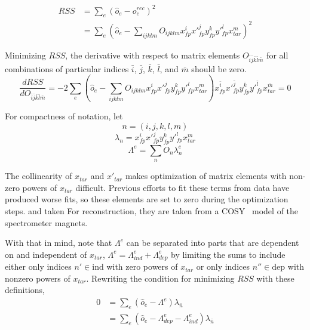 \begin{align}
    RSS &= \sum_e (\hat{o}_e - o^{rec}_e)^2 \\
           &= \sum_e \left( \hat{o}_e - \sum_{ijklm} O_{ijklm} x^i_{fp} x'^j_{fp} y^k_{fp} y'^l_{fp} x^m_{tar} \right)^2
\end{align}


Minimizing $RSS$, the derivative with respect to matrix elements
$O_{\bar{i}\bar{j}\bar{k}\bar{l}\bar{m}}$
for all combinations of particular indices
$\bar{i}$, $\bar{j}$, $\bar{k}$, $\bar{l}$, and $\bar{m}$
should be zero.
\begin{equation}
    \frac{dRSS}{dO_{\bar{i}\bar{j}\bar{k}\bar{l}\bar{m}}}
    = -2 \sum_e \left( \hat{o}_e - \sum_{ijklm} O_{ijklm} x^i_{fp} x'^j_{fp} y^k_{fp} y'^l_{fp} x^m_{tar} \right)
      x^{\bar{i}}_{fp} x'^{\bar{j}}_{fp} y^{\bar{k}}_{fp} y'^{\bar{l}}_{fp} x^{\bar{m}}_{tar}
    = 0
\end{equation}

For compactness of notation, let
\begin{equation} \label{eqn:index_abbreviation}
    n = (i,j,k,l,m)
\end{equation}
\begin{equation}
    \lambda_n = x^{i}_{fp} x'^{j}_{fp} y^{k}_{fp} y'^{l}_{fp} x^{m}_{tar}
\end{equation}
\begin{equation}
    \Lambda^e = \sum_n O_n \lambda^e_n
\end{equation}


The collinearity of $x_{tar}$ and $x'_{tar}$ makes optimization of matrix
elements with non-zero powers of $x_{tar}$ difficult.
Previous efforts to fit these terms from data have produced worse fits, so
these elements are set to zero during the optimization steps.
and taken
For reconstruction, they are taken from a COSY~\cite{COSY_9} model of the
spectrometer magnets.


With that in mind, note that $\Lambda^e$ can be separated into parts that are
dependent on and independent of $x_{tar}$,
$\Lambda^e = \Lambda^e_{ind} + \Lambda^e_{dep}$
by limiting the sums to include either
only indices $n'\in\text{ind}$ with zero powers of $x_{tar}$
or
only indices $n''\in\text{dep}$ with nonzero powers of $x_{tar}$.
Rewriting the condition for minimizing $RSS$ with these definitions,
\begin{align}
    0 &= \sum_e (\hat{o}_e - \Lambda^e) \lambda_{\bar{n}} \\
      &= \sum_e (\hat{o}_e - \Lambda^e_{dep} - \Lambda^e_{ind}) \lambda_{\bar{n}}
\end{align}

